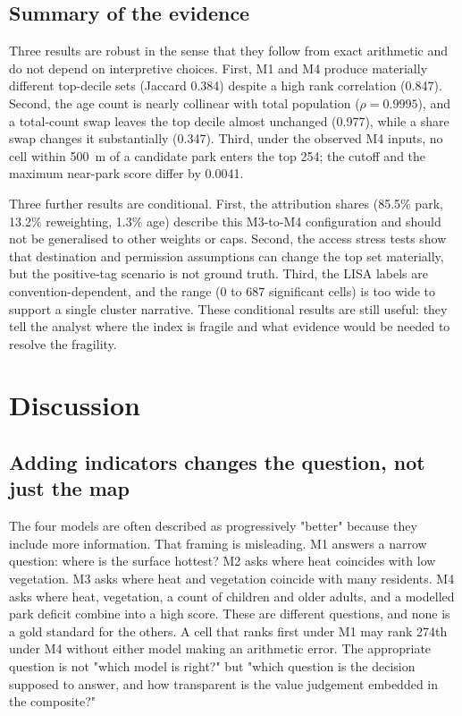 \documentclass[times,twoside]{_Templates/MultiTargetManuscript}
\begin{document}


\subsection{Summary of the evidence}

Three results are robust in the sense that they follow from exact arithmetic and
do not depend on interpretive choices. First, M1 and M4 produce materially
different top-decile sets (Jaccard 0.384) despite a high rank correlation
(0.847). Second, the age count is nearly collinear with total population
($\rho=0.9995$), and a total-count swap leaves the top decile almost unchanged
(0.977), while a share swap changes it substantially (0.347). Third, under the
observed M4 inputs, no cell within 500~m of a candidate park enters the top 254;
the cutoff and the maximum near-park score differ by 0.0041.

Three further results are conditional. First, the attribution shares (85.5\%
park, 13.2\% reweighting, 1.3\% age) describe this M3-to-M4 configuration and
should not be generalised to other weights or caps. Second, the access stress
tests show that destination and permission assumptions can change the top set
materially, but the positive-tag scenario is not ground truth. Third, the LISA
labels are convention-dependent, and the range (0 to 687 significant cells) is
too wide to support a single cluster narrative. These conditional results are
still useful: they tell the analyst where the index is fragile and what evidence
would be needed to resolve the fragility.

\section{Discussion}

\subsection{Adding indicators changes the question, not just the map}

The four models are often described as progressively "better" because they
include more information. That framing is misleading. M1 answers a narrow
question: where is the surface hottest? M2 asks where heat coincides with low
vegetation. M3 asks where heat and vegetation coincide with many residents. M4
asks where heat, vegetation, a count of children and older adults, and a modelled
park deficit combine into a high score. These are different questions, and none
is a gold standard for the others. A cell that ranks first under M1 may rank
274th under M4 without either model making an arithmetic error. The appropriate
question is not "which model is right?" but "which question is the decision
supposed to answer, and how transparent is the value judgement embedded in the
composite?"
\end{document}
